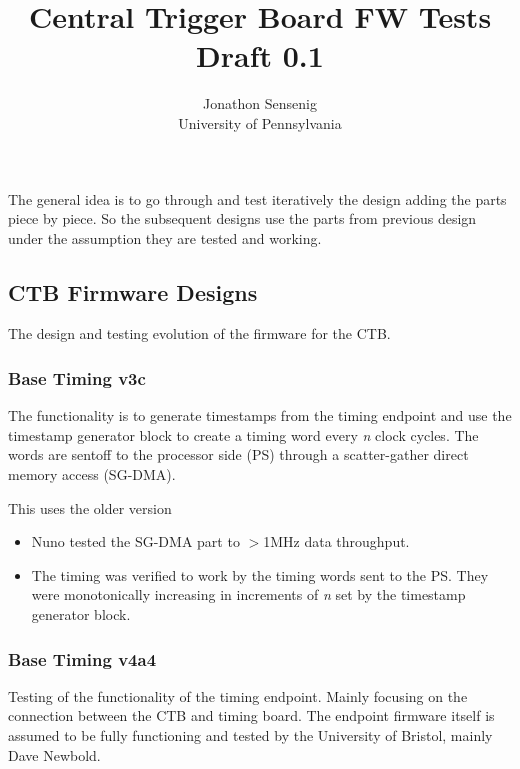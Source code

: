 \documentclass[]{report}
\title{Central Trigger Board FW Tests  \\ {\large Draft 0.1}}
\author{Jonathon Sensenig
	\\ \vspace{2em} University of Pennsylvania}
\begin{document}
\maketitle

\tableofcontents

\chapter{}

The general idea is to go through and test iteratively the design adding the parts piece by piece. So the subsequent designs use the parts from previous design under the assumption they are tested and working.

\section{CTB Firmware Designs}

The design and testing evolution of the firmware for the CTB.

\subsection{Base Timing v3c}

The functionality is to generate timestamps from the timing endpoint and use the timestamp generator block to create a timing word every 
\textit{n} clock cycles. The words are sentoff to the processor side (PS) through a scatter-gather direct memory access (SG-DMA). 

This uses the older version 

	\begin{itemize}
		\item Nuno tested the SG-DMA part to $>$1MHz data throughput.
		\item The timing was verified to work by the timing words sent to the PS. They were
		monotonically increasing in increments of \textit{n} set by the timestamp generator block.
	\end{itemize}
 
\subsection{Base Timing v4a4}

Testing of the functionality of the timing endpoint. Mainly focusing on the connection between the CTB and timing board. The endpoint firmware itself is assumed to be fully functioning and tested by the University of Bristol, mainly Dave Newbold. 
\end{document}
